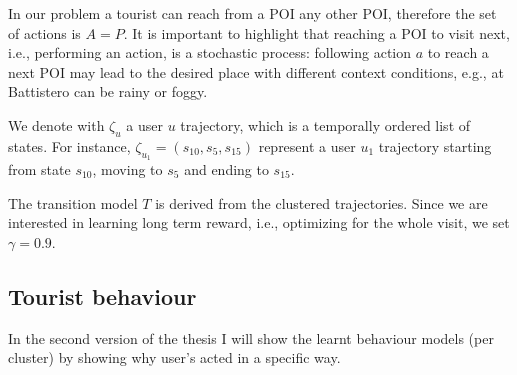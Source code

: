 In our problem a tourist can reach from a POI any other POI, therefore the set of actions is $A=P$. It is important to highlight that reaching a POI to visit next, i.e., performing an action, is a stochastic process: following action $a$ to reach a next POI may lead to the desired place with different context conditions, e.g., at Battistero can be rainy or foggy.

We denote with $\zeta_u$ a user $u$ trajectory, which is a temporally ordered list of states. For instance, $\zeta_{u_1} = (s_{10}, s_5, s_{15})$ represent a user $u_1$ trajectory starting from state $s_{10}$, moving to $s_5$ and ending to $s_{15}$.

The transition model $T$ is derived from the clustered trajectories.
Since we are interested in learning long term reward, i.e., optimizing for the whole visit, we set $\gamma=0.9$.


\subsection{Tourist behaviour}
In the second version of the thesis I will show the learnt behaviour models (per cluster) by showing why user's acted in a specific way. 
